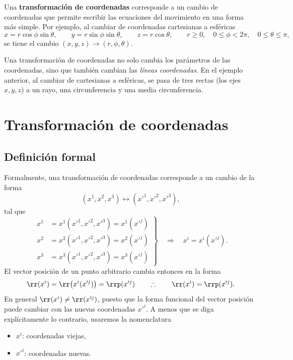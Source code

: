 Una \textbf{transformación de coordenadas} corresponde a un cambio de coordenadas que permite escribir las ecuaciones del movimiento en una forma más simple. Por ejemplo, al cambiar de coordenadas cartesianas a esféricas
\begin{equation}
x = r\cos\phi\sin\theta,\qquad y = r\sin\phi\sin\theta,\qquad z = r\cos\theta,
\qquad r\ge 0,\quad 0\le\phi<2\pi,\quad 0\le\theta\le\pi,
\end{equation}
se tiene el cambio $(x,y,z)\longrightarrow (r,\phi,\theta)$.

Una transformación de coordenadas no solo cambia los parámetros de las coordenadas, sino que también cambian las \emph{líneas coordenadas}. En el ejemplo anterior, al cambiar de cartesianas a esféricas, se pasa de tres rectas (los ejes $x,y,z$) a un rayo, una circunferencia y una media circunferencia.

\section{Transformación de coordenadas}

\subsection{Definición formal}

Formalmente, una transformación de coordenadas corresponde a un cambio de la forma
\begin{equation}
(x^1,x^2,x^3) \longleftrightarrow (x'^1,x'^2,x'^3),
\end{equation}
tal que
\begin{equation}
\left.
\begin{aligned}
x^1 &= x^1(x'^1,x'^2,x'^3) = x^1(x'^j) \\
x^2 &= x^2(x'^1,x'^2,x'^3) = x^2(x'^j) \\
x^3 &= x^3(x'^1,x'^2,x'^3) = x^3(x'^j)
\end{aligned}
\right\}
\quad\Longrightarrow\quad x^i = x^i(x'^j).
\end{equation}
El vector posición de un punto arbitrario cambia entonces en la forma
\begin{equation}
\rr(x^i) = \rr\big(x^i(x'^j)\big) = \rrp(x'^j)
\qquad\therefore\qquad \rr(x^i) = \rrp(x'^j).
\end{equation}
En general $\rr(x^i)\neq \rr(x'^j)$, puesto que la forma funcional del vector posición puede cambiar con las nuevas coordenadas $x'^i$. A menos que se diga explícitamente lo contrario, usaremos la nomenclatura
\begin{itemize}
\item $x^i$: coordenadas viejas,
\item $x'^i$: coordenadas nuevas.
\end{itemize}

